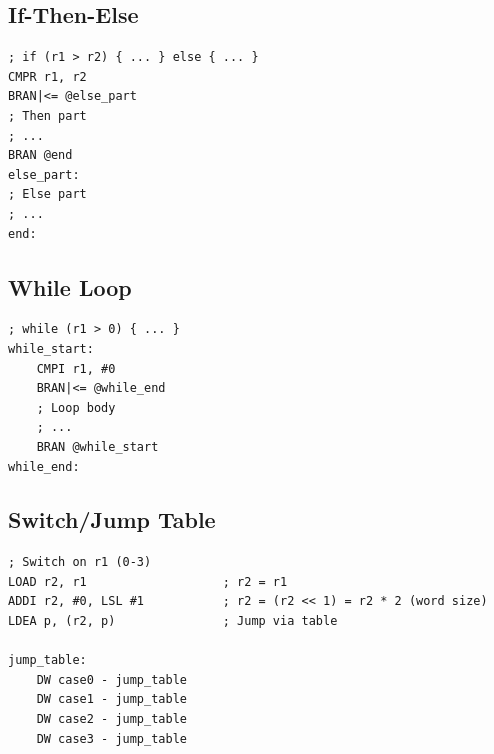 \subsection{If-Then-Else}
\begin{lstlisting}
; if (r1 > r2) { ... } else { ... }
CMPR r1, r2
BRAN|<= @else_part
; Then part
; ...
BRAN @end
else_part:
; Else part
; ...
end:
\end{lstlisting}

\subsection{While Loop}
\begin{lstlisting}
; while (r1 > 0) { ... }
while_start:
    CMPI r1, #0
    BRAN|<= @while_end
    ; Loop body
    ; ...
    BRAN @while_start
while_end:
\end{lstlisting}

\subsection{Switch/Jump Table}
\begin{lstlisting}
; Switch on r1 (0-3)
LOAD r2, r1                   ; r2 = r1
ADDI r2, #0, LSL #1           ; r2 = (r2 << 1) = r2 * 2 (word size)
LDEA p, (r2, p)               ; Jump via table

jump_table:
    DW case0 - jump_table
    DW case1 - jump_table
    DW case2 - jump_table
    DW case3 - jump_table
\end{lstlisting}
